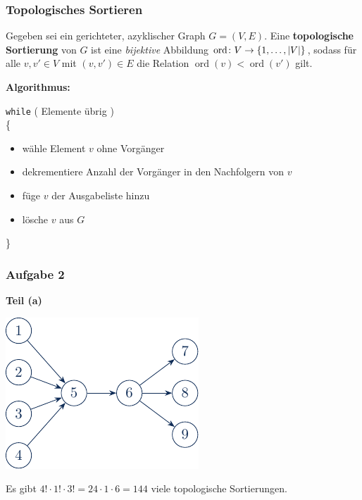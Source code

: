 \documentclass{beamer}
\begin{document}
\begin{frame} \frametitle{Topologisches Sortieren}
	\small
	Gegeben sei ein gerichteter, azyklischer Graph $G = (V,E)$. Eine \textbf{topologische Sortierung} von $G$ ist eine \textit{bijektive} Abbildung $\operatorname{ord} \colon V \to \left\{ 1, \dots, \left| V \right| \right\}$, sodass für alle $v, v' \in V$ mit $(v,v') \in E$ die Relation
	$\operatorname{ord}(v) < \operatorname{ord}(v')$ gilt.
	
	\pause
	
	\textbf{Algorithmus:}
	
	\texttt{while} ( Elemente übrig ) \\
	\{  %
		\begin{itemize}
			\item wähle Element $v$ ohne Vorgänger
			\item dekrementiere Anzahl der Vorgänger in den Nachfolgern von $v$
			\item füge $v$ der Ausgabeliste hinzu
			\item lösche $v$ aus $G$
		\end{itemize}
	\}
	 
\end{frame}

\begin{frame} \frametitle{Aufgabe 2}
	\textbf{Teil (a)}
	\begin{center}
		\includegraphics[width=0.5\linewidth]{tut10-aufgabe2a}
	\end{center}
	\pause
	Es gibt $4! \cdot 1! \cdot 3! = 24 \cdot 1 \cdot 6 = 144$ viele topologische Sortierungen.
\end{frame}
\end{document}
